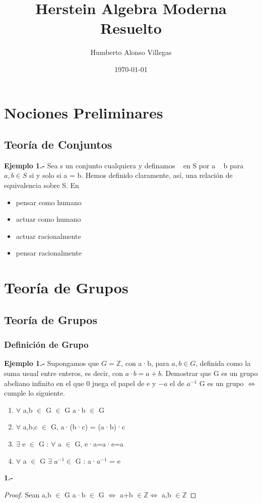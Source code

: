 \documentclass[10pt,a4paper,oneside]{article}
\title{Herstein Algebra Moderna\\Resuelto} %
\author{Humberto Alonso Villegas} %
\date{\today} %
\begin{document}
	\maketitle %
	\newpage
	
	\chapter{Nociones Preliminares}
		\section[''Teoría de Conjuntos'']{Teoría de Conjuntos}
			\textbf{Ejemplo 1.-} Sea s un conjunto cualquiera y definamos ~ en S por a ~ b para $a, b \in S $ si y solo si a = b. Hemos definido claramente, así, una relación de equivalencia sobre S. En 
			
			\begin{itemize}
			\item pensar como humano
			\item actuar como humano
			\item actuar racionalmente
			\item pensar racionalmente
			\end {itemize}
			\newpage
	\newpage



	\chapter{Teoría de Grupos}
		\section["Teoría de"]{Teoría de Grupos}
			\subsection{Definición de Grupo}
			\textbf{Ejemplo 1.-} Supongamos que $G = \mathbb{Z}$, con a·b, para $a,b\in G$, definida como la suma usual entre enteros, es decir, con $a·b=a+b$. Demostrar que G es un grupo abeliano infinito en el que 0 juega el papel de e y $-a$ el de $a^{-1}$
			G es un grupo $\iff$ cumple lo siguiente.
			\begin{enumerate}
				\item $\forall$ a,b $\in$ G $\in$ G a·b $\in$ G
				\item $\forall$ a,b,c $\in$ G, a·(b·c) = (a·b)·c
				\item $\exists$ e $\in$ G : $\forall$ a $\in$ G, e·a=a·e=a
				\item $\forall$ a $\in$ G $\exists$ $a^{-1} \in$ G : a·$a^{-1}$ = e
			\end{enumerate}

			\textbf{1.-}
			\begin{proof}
				Sean a,b $\in$ G a·b $\in$ G $\iff$ a+b $\in \mathbb{Z} \iff$ a,b $\in \mathbb{Z}$
			\end{proof}
\end{document}
